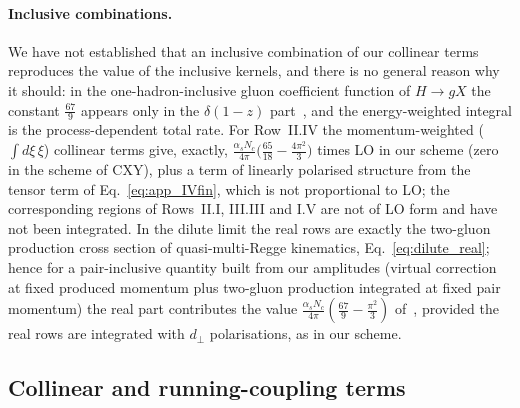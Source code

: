 \paragraph{Inclusive combinations.} We have not established that an inclusive combination of our collinear terms reproduces the value of the inclusive kernels, and there is no general reason why it should: in the one-hadron-inclusive gluon coefficient function of $H\to gX$ the constant $\frac{67}{9}$ appears only in the $\delta(1-z)$ part~\cite{Almasy:2011eq}, and the energy-weighted integral is the process-dependent total rate. For Row~II.IV the momentum-weighted ($\int d\xi\,\xi$) collinear terms give, exactly, $\frac{\alpha_sN_c}{4\pi}\big(\frac{65}{18}-\frac{4\pi^2}{3}\big)$ times LO in our scheme (zero in the scheme of CXY), plus a term of linearly polarised structure from the tensor term of Eq.~\eqref{eq:app_IVfin}, which is not proportional to LO; the corresponding regions of Rows~II.I, III.III and I.V are not of LO form and have not been integrated. In the dilute limit the real rows are exactly the two-gluon production cross section of quasi-multi-Regge kinematics, Eq.~\eqref{eq:dilute_real}; hence for a pair-inclusive quantity built from our amplitudes (virtual correction at fixed produced momentum plus two-gluon production integrated at fixed pair momentum) the real part contributes the value $\frac{\alpha_sN_c}{4\pi}(\frac{67}{9}-\frac{\pi^2}{3})$ of~\cite{Fadin:1998py}, provided the real rows are integrated with $d_\perp$ polarisations, as in our scheme.

\subsection{Collinear and running-coupling terms}\label{sec:lit_dglap}


